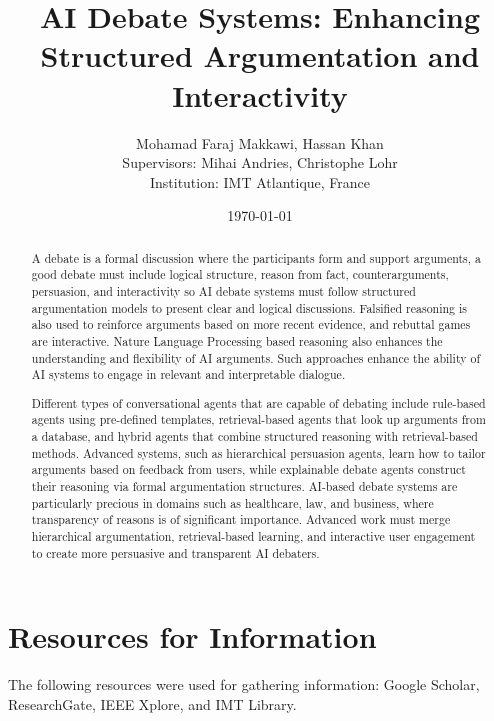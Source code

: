 \documentclass[12pt]{article}
\title{AI Debate Systems: Enhancing Structured Argumentation and Interactivity}
\author{Mohamad Faraj Makkawi, Hassan Khan\\
    Supervisors: Mihai Andries, Christophe Lohr\\
    Institution: IMT Atlantique, France}
\date{\today}
\begin{document}
\maketitle

\begin{abstract}
    A debate is a formal discussion where the participants form and support arguments, a good debate must include logical structure, reason from fact, counterarguments, persuasion, and interactivity so AI debate systems must follow structured argumentation models to present clear and logical discussions. Falsified reasoning is also used to reinforce arguments based on more recent evidence, and rebuttal games are interactive. Nature Language Processing based reasoning also enhances the understanding and flexibility of AI arguments. Such approaches enhance the ability of AI systems to engage in relevant and interpretable dialogue.

    Different types of conversational agents that are capable of debating include rule-based agents using pre-defined templates, retrieval-based agents that look up arguments from a database, and hybrid agents that combine structured reasoning with retrieval-based methods. Advanced systems, such as hierarchical persuasion agents, learn how to tailor arguments based on feedback from users, while explainable debate agents construct their reasoning via formal argumentation structures. AI-based debate systems are particularly precious in domains such as healthcare, law, and business, where transparency of reasons is of significant importance. Advanced work must merge hierarchical argumentation, retrieval-based learning, and interactive user engagement to create more persuasive and transparent AI debaters.
\end{abstract}

\section{Resources for Information}
\begin{small}
The following resources were used for gathering information: Google Scholar, ResearchGate, IEEE Xplore, and IMT Library.
\end{small}
\end{document}
